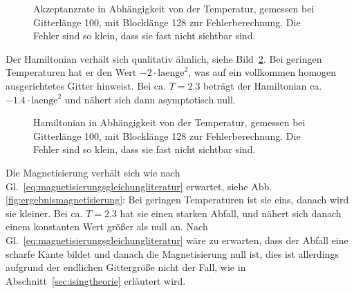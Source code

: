 	
	\begin{figure}[htbp]
		
		\caption[Akzeptanzrate in Abhängigkeit von der Temperatur]{Akzeptanzrate in Abhängigkeit von der Temperatur, gemessen bei Gitterlänge 100, mit Blocklänge 128 zur Fehlerberechnung. Die Fehler sind so klein, dass sie fast nicht sichtbar sind.}
		\label{fig:ergebnisakzeptanzrate}
	\end{figure}
	
	Der Hamiltonian verhält sich qualitativ ähnlich, siehe Bild~\ref{fig:ergebnishamiltonian}. Bei geringen Temperaturen hat er den Wert $-2\cdot\text{laenge}^2$, was auf ein vollkommen homogen ausgerichtetes Gitter hinweist. Bei ca.{} $T=\num{2,3}$ beträgt der Hamiltonian ca.{} $-\num{1,4}\cdot\text{laenge}^2$ und nähert sich dann asymptotisch null.
	
	
	
	
	\begin{figure}[htbp]
		
		\caption[Hamiltonian in Abhängigkeit von der Temperatur]{Hamiltonian in Abhängigkeit von der Temperatur, gemessen bei Gitterlänge 100, mit Blocklänge 128 zur Fehlerberechnung. Die Fehler sind so klein, dass sie fast nicht sichtbar sind.}
		\label{fig:ergebnishamiltonian}
	\end{figure}
	

	Die Magnetisierung verhält sich wie nach Gl.~\ref{eq:magnetisierungsgleichungliteratur} erwartet, siehe Abb. \ref{fig:ergebnismagnetisierung}: Bei geringen Temperaturen ist sie eins, danach wird sie kleiner. Bei ca. $T=\num{2,3}$ hat sie einen starken Abfall, und nähert sich danach einem konstanten Wert größer als null an. Nach Gl.~\ref{eq:magnetisierungsgleichungliteratur} wäre zu erwarten, dass der Abfall eine scharfe Kante bildet und danach die Magnetisierung null ist, dies ist allerdings aufgrund der endlichen Gittergröße nicht der Fall, wie in Abschnitt~\ref{sec:isingtheorie} erläutert wird.
	


